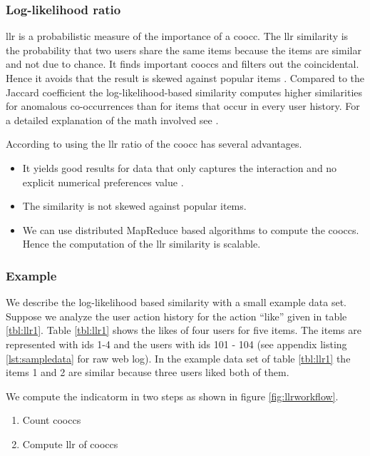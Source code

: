\subsubsection{Log-likelihood ratio}
\label{sec:llrs}

\Gls{llr} is a probabilistic measure of the importance of a \gls{coocc}. The \gls{llr} similarity  is the probability that two users share the same items because the items are similar and not due to chance. It finds important \glspl{coocc} and filters out the coincidental. Hence it avoids that the result is skewed against popular items \cite{Dunning93}. Compared to the Jaccard coefficient \cite{Hartung} the log-likelihood-based similarity computes higher similarities for anomalous co-occurrences than for items that occur in every user history. For a detailed explanation of the math involved see \cite{Dunning93}. 

According to \cite{Dunning14} using the \gls{llr} ratio of the \gls{coocc} has several advantages.
\begin{itemize}
\item It yields good results for data that only captures the interaction and no explicit numerical \glspl{preference} value \cite{Dunning93}.
\item The similarity is not skewed against popular items.
\item We can use distributed MapReduce based algorithms to compute the \glspl{coocc}. Hence the computation of the \gls{llr} similarity is \gls{scalable}.
\end{itemize}

\subsubsection{Example}
\label{sec:llrexample}

We describe the log-likelihood based similarity with a small example data set. Suppose we analyze the user action history for the action ``like'' given in table \ref{tbl:llr1}. 
Table \ref{tbl:llr1} shows the likes of four users for five items. The items are represented with ids 1-4 and the users with ids 101 - 104  (see appendix listing \ref{lst:sampledata} for raw web log).
In the example data set of table \ref{tbl:llr1} the items 1 and 2 are similar because three users liked both of them.

We compute the \gls{indicatorm} in two steps as shown in figure \ref{fig:llrworkflow}.
\begin{enumerate}
\item Count \glspl{coocc}
\item Compute \gls{llr} of \glspl{coocc}
\end{enumerate}

